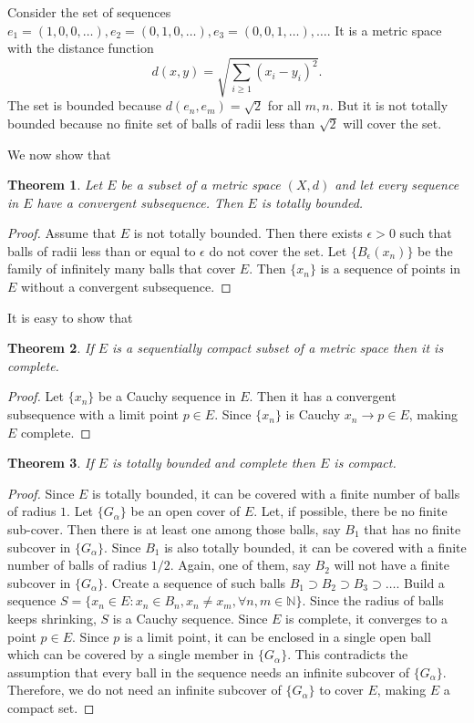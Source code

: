 \documentclass{article}
\theoremstyle{plain}
\newtheorem{thm}{Theorem}
\numberwithin{thm}{section}
\theoremstyle{plain}
\numberwithin{prop}{section}
\theoremstyle{definition}
\numberwithin{defn}{section}
\theoremstyle{remark}
\numberwithin{equation}{section}
\begin{document}
Consider the set of sequences $e_1 = (1, 0, 0, \ldots), e_2 = (0, 1, 0, \ldots),
e_3 = (0, 0, 1, \ldots), \ldots$. It is a metric space with the distance 
function 
\[
d(x, y) = \sqrt{\sum_{i \ge 1}(x_i - y_i)^2}.
\]
The set is bounded because $d(e_n, e_m) = \sqrt{2}$ for all $m, n$. But it is
not totally bounded because no finite set of balls of radii less than $\sqrt{2}$
will cover the set.

We now show that
\begin{thm}\label{s2t15}
Let $E$ be a subset of a metric space $(X, d)$ and let every sequence in $E$
have a convergent subsequence. Then $E$ is totally bounded.
\end{thm}
\begin{proof}
Assume that $E$ is not totally bounded. Then there exists $\epsilon > 0$
such that balls of radii less than or equal to $\epsilon$ do not cover the set.
Let $\{B_\epsilon(x_n)\}$ be the family of infinitely many balls that cover $E$.
Then $\{x_n\}$ is a sequence of points in $E$ without a convergent subsequence.
\end{proof}

It is easy to show that
\begin{thm}\label{s2t16}
If $E$ is a sequentially compact subset of a metric space then it is complete.
\end{thm}
\begin{proof}
Let $\{x_n\}$ be a Cauchy sequence in $E$. Then it has a convergent subsequence
with a limit point $p \in E$. Since $\{x_n\}$ is Cauchy $x_n \rightarrow p \in
E$, making $E$ complete.
\end{proof}

\begin{thm}\label{s2t17}
If $E$ is totally bounded and complete then $E$ is compact.
\end{thm}
\begin{proof}
Since $E$ is totally bounded, it can be covered with a finite number of balls 
of radius $1$. Let $\{G_\alpha\}$ be an open cover of $E$. Let, if possible, 
there be no finite sub-cover. Then there is at least one among those balls,
say $B_1$ that has no finite subcover in $\{G_\alpha\}$. Since $B_1$ is also
totally bounded, it can be covered with a finite number of balls of radius $1/2$.
Again, one of them, say $B_2$ will not have a finite subcover in $\{G_\alpha\}$.
Create a sequence of such balls $B_1 \supset B_2 \supset B_3 \supset \ldots$.
Build a sequence $S = \{x_n \in E: x_n \in B_n, x_n \ne x_m, \forall n, m \in
\mathbb{N}\}$. Since the radius of balls keeps shrinking, $S$ is a Cauchy
sequence. Since $E$ is complete, it converges to a point $p \in E$. Since $p$
is a limit point, it can be enclosed in a single open ball which can be covered
by a single member in $\{G_\alpha\}$. This contradicts the assumption that every
ball in the sequence needs an infinite subcover of $\{G_\alpha\}$. Therefore, 
we do not need an infinite subcover of $\{G_\alpha\}$ to cover $E$, making $E$
a compact set.
\end{proof}
\end{document}
